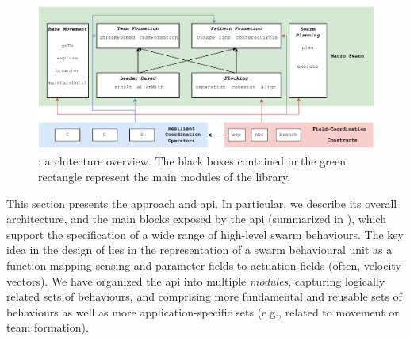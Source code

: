 
\begin{figure}[t]
  \includegraphics[width=\textwidth]{papers/coordination2023-macro/images/architecture.drawio.pdf}
  \caption[\MacroSwarm{}: architecture overview.]{\MacroSwarm{}: architecture overview. 
  The black boxes contained in the green rectangle 
  represent the main modules of the library.
  }\label{fig:architecture}
\end{figure}

This section presents the \MacroSwarm{} approach and \ac{api}.
%
In particular, we describe its overall architecture, and the main blocks exposed by the \ac{api}
 (summarized in ), 
 which support the specification of a wide range of high-level swarm behaviours. 
%
The key idea in the design of \MacroSwarm{}  
 lies in the representation of a swarm behavioural unit 
 as a function mapping sensing and parameter fields 
 to actuation fields (often, velocity vectors).
%
We have organized the \ac{api}
 into multiple \emph{modules},
 capturing logically related sets of behaviours,
 and
 comprising more fundamental and reusable sets of behaviours
 as well as more application-specific sets (e.g., related to movement or team formation).
 
